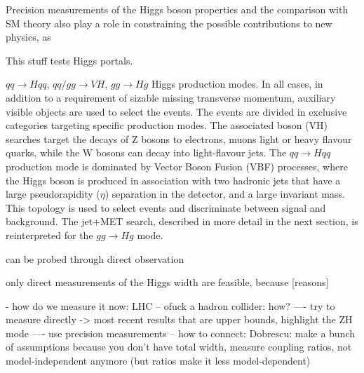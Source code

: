 
Precision measurements of the Higgs boson properties and the comparison with SM theory also play a role in constraining the possible contributions to new physics, as 





This stuff tests Higgs portals.



$qq \rightarrow H qq$, $qq/gg \rightarrow VH$, $gg \rightarrow Hg$ Higgs production modes. 
In all cases, in addition to a requirement of sizable missing transverse momentum, auxiliary visible objects are used to select the events. 
The events are divided in exclusive categories targeting specific production modes. The associated boson (VH) searches target the decays of Z bosons to electrons, muons light or heavy flavour quarks, while the W bosons can decay into light-flavour jets. 
The $qq \rightarrow H qq$ production mode is dominated by Vector Boson Fusion (VBF) processes, where the Higgs boson is produced in association with two hadronic jets that have a large pseudorapidity ($\eta$)
separation in the detector, and a large invariant mass. This topology is used to select events and discriminate between signal and background. 
The jet+MET search, described in more detail in the next section, is reinterpreted for the $gg \rightarrow Hg$ mode. 


can be probed through direct observation  

only direct measurements of the Higgs width are feasible, because [reasons]

- how do we measure it now: LHC 
-- ofuck a hadron collider: how?
---- try to measure directly -> most recent results that are upper bounds, highlight the ZH mode
---- use precision measurements
-- how to connect: Dobrescu: make a bunch of assumptions because you don't have total width, measure coupling ratios, not model-independent anymore (but ratios make it less model-dependent)

